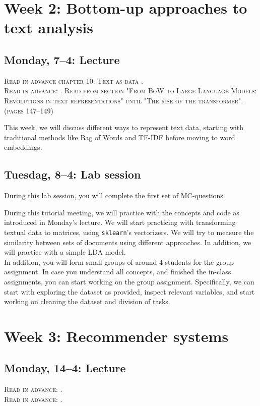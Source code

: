 \section*{Week 2:  Bottom-up approaches to text analysis}

\subsection*{Monday, 7--4: Lecture}


\textsc{Read in advance chapter 10: Text as data \cite{van_atteveldt_computational_2022}.} \\
\textsc{Read in advance: \cite{kroon2024advancing}.} \textsc{Read from section "From BoW to Large Language Models: Revolutions in text representations" until "The rise of the transformer". (pages 147–149)}


This week, we will discuss different ways to represent text data, starting with traditional methods like Bag of Words and TF-IDF before moving to word embeddings. 

\subsection*{Tuesdag, 8--4: Lab session}
During this lab session, you will complete the first set of MC-questions. 

During this tutorial meeting, we will practice with the concepts and code as introduced in Monday's lecture.  We will start practicing with transforming textual data to matrices, using  \texttt{sklearn}'s vectorizers. We will try to measure the similarity between sets of documents using different approaches. In addition, we will practice with a simple LDA model. \\

In addition, you will form small groups of around 4 students for the group assignment. In case you understand all concepts, and finished the in-class assignments, you can start working on the group assignment. Specifically, we can start with exploring the dataset as provided, inspect relevant variables, and start working on cleaning the dataset and division of tasks. 

\section*{Week 3: Recommender systems}

\subsection*{Monday, 14--4: Lecture}
\textsc{ Read in advance: \cite{Moller2018}.}\\
\textsc{ Read in advance: \cite{Loecherbach2020}.}\\

